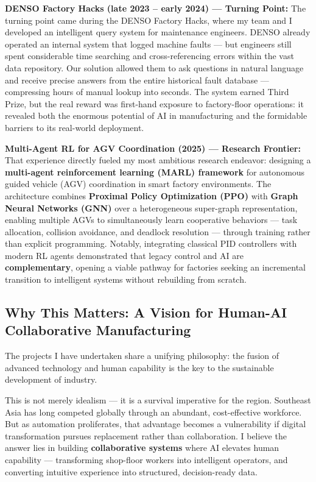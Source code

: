 \documentclass[
  12pt,
]{article}
\begin{document}
\textbf{DENSO Factory Hacks (late 2023 – early 2024) — Turning Point:}
The turning point came during the DENSO Factory Hacks, where my team and
I developed an intelligent query system for maintenance engineers. DENSO
already operated an internal system that logged machine faults — but
engineers still spent considerable time searching and cross-referencing
errors within the vast data repository. Our solution allowed them to ask
questions in natural language and receive precise answers from the
entire historical fault database — compressing hours of manual lookup
into seconds. The system earned Third Prize, but the real reward was
first-hand exposure to factory-floor operations: it revealed both the
enormous potential of AI in manufacturing and the formidable barriers to
its real-world deployment.

\textbf{Multi-Agent RL for AGV Coordination (2025) — Research Frontier:}
That experience directly fueled my most ambitious research endeavor:
designing a \textbf{multi-agent reinforcement learning (MARL) framework}
for autonomous guided vehicle (AGV) coordination in smart factory
environments. The architecture combines \textbf{Proximal Policy
Optimization (PPO)} with \textbf{Graph Neural Networks (GNN)} over a
heterogeneous super-graph representation, enabling multiple AGVs to
simultaneously learn cooperative behaviors — task allocation, collision
avoidance, and deadlock resolution — through training rather than
explicit programming. Notably, integrating classical PID controllers
with modern RL agents demonstrated that legacy control and AI are
\textbf{complementary}, opening a viable pathway for factories seeking
an incremental transition to intelligent systems without rebuilding from
scratch.

\hypertarget{why-this-matters-a-vision-for-human-ai-collaborative-manufacturing}{%
\subsection{Why This Matters: A Vision for Human-AI Collaborative
Manufacturing}\label{why-this-matters-a-vision-for-human-ai-collaborative-manufacturing}}

The projects I have undertaken share a unifying philosophy: the fusion
of advanced technology and human capability is the key to the
sustainable development of industry.

This is not merely idealism — it is a survival imperative for the
region. Southeast Asia has long competed globally through an abundant,
cost-effective workforce. But as automation proliferates, that advantage
becomes a vulnerability if digital transformation pursues replacement
rather than collaboration. I believe the answer lies in building
\textbf{collaborative systems} where AI elevates human capability —
transforming shop-floor workers into intelligent operators, and
converting intuitive experience into structured, decision-ready data.
\end{document}
